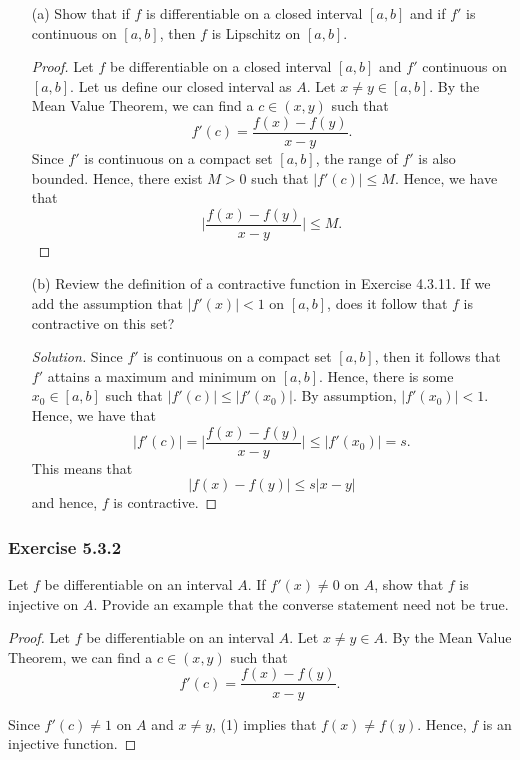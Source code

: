\begin{enumerate}
    \item[(a)] Show that if \( f  \) is differentiable on a closed interval \( [a,b]  \) and if \( f'  \) is continuous on \( [a,b]  \), then \( f  \) is Lipschitz on \( [a,b]  \).
        \begin{proof}
            Let \( f  \) be differentiable on a closed interval \( [a,b]  \) and \( f'  \) continuous on \( [a,b]  \). Let us define our closed interval as \( A  \). Let \( x \neq y \in [a,b]  \). By the Mean Value Theorem, we can find a \( c \in (x,y)  \) such that 
            \[  f'(c) = \frac{ f(x) - f(y)  }{ x - y  }. \]
            Since \( f' \) is continuous on a compact set \( [a,b]  \), the range of \( f'  \) is also bounded. Hence, there exist \( M > 0  \) such that \( | f'(c)  | \leq M  \). Hence, we have that 
            \[  \Big| \frac{ f(x) - f(y)  }{ x -y  }  \Big| \leq M. \]
        \end{proof}
    \item[(b)] Review the definition of a contractive function in Exercise 4.3.11. If we add the assumption that \( | f'(x)  | < 1  \) on \( [a,b]  \), does it follow that \( f  \) is contractive on this set? 
    \begin{proof}[Solution]
        Since \( f'  \) is continuous on a compact set \( [a,b]  \), then it follows that \( f'  \) attains a maximum and minimum on \( [a,b]  \). Hence, there is some \( x_0 \in [a,b]  \) such that \( | f'(c)  | \leq | f'(x_0) |  \). By assumption, \( | f'(x_0) | < 1  \). Hence, we have that 
        \[ | f'(c)  | = \Big| \frac{ f(x) - f(y)  }{ x -y  }  \Big| \leq | f'(x_0)  | = s.  \]
        This means that 
        \[  | f(x) - f(y)  | \leq s | x - y  | \]
        and hence, \( f  \) is contractive.
    \end{proof}
\end{enumerate}

\subsubsection{Exercise 5.3.2} Let \( f  \) be differentiable on an interval \( A  \). If \( f'(x) \neq 0  \) on \( A  \), show that \( f  \) is injective on \( A  \). Provide an example that the converse statement need not be true.

\begin{proof}
    Let \( f  \) be differentiable on an interval \( A  \). Let \( x \neq y  \in A  \). By the Mean Value Theorem, we can find a \( c \in (x,y) \) such that 
    \[  f'(c) = \frac{ f(x) - f(y)  }{ x - y  } \tag{1}. \]

    Since \( f'(c) \neq 1  \) on \( A  \) and \( x \neq y  \), (1) implies that \( f(x) \neq f(y)  \). Hence, \( f  \) is an injective function. 
\end{proof}

